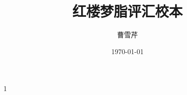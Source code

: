 	\author{曹雪芹}
	\title{红楼梦脂评汇校本}
	\date{\today}
	\maketitle
	\frontmatter
	
	
1
    \mainmatter
\tableofcontents
%
%
%
%
%
%
%
%
%
%
%
%
%
%
%
%
%
%
%
%
%
%
%
%
%
%
%
%
%
%
%
%
%
%
%
%
%
%
%
%
%
%
%
%
%
%
%

%
%
%
%
%
%
%
%
%
%
%


















%
%
%
%
%
%
